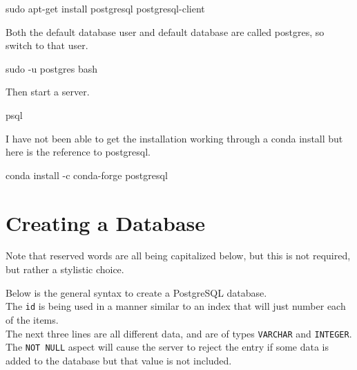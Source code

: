 \documentclass[]{book}
\newenvironment{Shaded}{\begin{snugshade}}{\end{snugshade}}
\newcommand{\FunctionTok}[1]{\textcolor[rgb]{0.00,0.00,0.00}{#1}}
\newcommand{\ExtensionTok}[1]{#1}
\newcommand{\NormalTok}[1]{#1}
\begin{document}
\begin{Shaded}
\begin{Highlighting}[]
\FunctionTok{sudo}\NormalTok{ apt-get install postgresql postgresql-client}
\end{Highlighting}
\end{Shaded}

Both the default database user and default database are called postgres,
so switch to that user.

\begin{Shaded}
\begin{Highlighting}[]
\FunctionTok{sudo}\NormalTok{ -u postgres bash}
\end{Highlighting}
\end{Shaded}

Then start a server.

\begin{Shaded}
\begin{Highlighting}[]
\ExtensionTok{psql}
\end{Highlighting}
\end{Shaded}

I have not been able to get the installation working through a conda
install but here is the reference to postgresql.

\begin{Shaded}
\begin{Highlighting}[]
\ExtensionTok{conda}\NormalTok{ install -c conda-forge postgresql}
\end{Highlighting}
\end{Shaded}

\section{Creating a Database}\label{creating-a-database}

Note that reserved words are all being capitalized below, but this is
not required, but rather a stylistic choice.

Below is the general syntax to create a PostgreSQL database.\\
The \texttt{id} is being used in a manner similar to an index that will
just number each of the items.\\
The next three lines are all different data, and are of types
\texttt{VARCHAR} and \texttt{INTEGER}.\\
The \texttt{NOT\ NULL} aspect will cause the server to reject the entry
if some data is added to the database but that value is not included.
\end{document}
